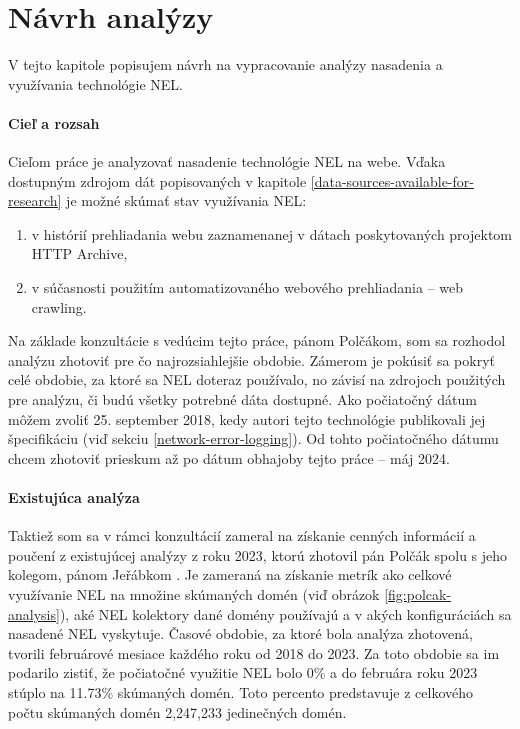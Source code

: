 \chapter{Návrh analýzy}
\label{possible-analysis-strategies}


V tejto kapitole popisujem návrh na vypracovanie analýzy nasadenia a využívania technológie NEL.

\subsubsection{Cieľ a rozsah}

Cieľom práce je analyzovať nasadenie technológie NEL na webe. 
Vďaka dostupným zdrojom dát popisovaných v kapitole \ref{data-sources-available-for-research} je možné skúmať stav využívania NEL:
\begin{enumerate}
    \item v histórií prehliadania webu zaznamenanej v dátach poskytovaných projektom HTTP Archive,
    \item v súčasnosti použitím automatizovaného webového prehliadania -- web crawling.
\end{enumerate}

Na základe konzultácie s vedúcim tejto práce, pánom Polčákom, som sa rozhodol analýzu zhotoviť pre čo 
najrozsiahlejšie obdobie.
Zámerom je pokúsiť sa pokryť celé obdobie, za ktoré sa NEL doteraz používalo, no závisí na zdrojoch použitých pre analýzu, či budú všetky potrebné dáta dostupné.
Ako počiatočný dátum môžem zvoliť 25. september 2018, kedy autori tejto technológie publikovali jej špecifikáciu (viď sekciu \ref{network-error-logging}).
Od tohto počiatočného dátumu chcem zhotoviť prieskum až po dátum obhajoby tejto práce -- máj 2024.

\subsubsection{Existujúca analýza}

Taktiež som sa v rámci konzultácií zameral na získanie cenných informácií a poučení z existujúcej analýzy z roku 2023,
ktorú zhotovil pán Polčák spolu s jeho kolegom, pánom Jeřábkom \cite{nel-http-archive}.
Je zameraná na získanie metrík ako celkové využívanie NEL na množine skúmaných domén (viď obrázok \ref{fig:polcak-analysis}), aké NEL kolektory dané domény používajú a v akých konfiguráciách sa nasadené NEL vyskytuje.
Časové obdobie, za ktoré bola analýza zhotovená, tvorili februárové mesiace každého roku od 2018 do 2023. 
Za toto obdobie sa im podarilo zistiť, že počiatočné využitie NEL bolo 0\% a do februára roku 2023 stúplo na 11.73\% skúmaných domén.
Toto percento predstavuje z celkového počtu skúmaných domén 2,247,233 jedinečných domén.

